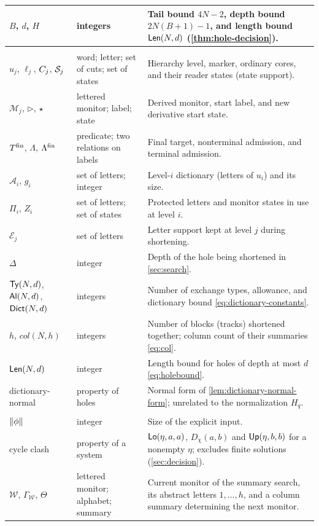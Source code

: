 \begin{longtable}{@{}>{\raggedright\arraybackslash}p{.21\linewidth}>{\raggedright\arraybackslash}p{.28\linewidth}>{\raggedright\arraybackslash}p{.44\linewidth}@{}}
$B$, $d$, $H$ & integers & Tail bound $4N-2$, depth bound $2N(B+1)-1$, and length bound $\mathsf{Len}(N,d)$ (\cref{thm:hole-decision}).\\
\midrule
\multicolumn{3}{@{}l}{\emph{Hierarchies and compression (\cref{sec:depth,sec:search,sec:complexity})}}\\
$u_j$, $\ell_j$, $C_j$, $\mathcal S_j$ & word; letter; set of cuts; set of states & Hierarchy level, marker, ordinary cores, and their reader states (state support).\\
$\mathcal M_j$, $\triangleright$, $\star$ & lettered monitor; label; state & Derived monitor, start label, and new derivative start state.\\
$T^{\mathrm{fin}}$, $\Lambda$, $\Lambda^{\mathrm{fin}}$ & predicate; two relations on labels & Final target, nonterminal admission, and terminal admission.\\
$\mathcal A_i$, $g_i$ & set of letters; integer & Level-$i$ dictionary (letters of $u_i$) and its size.\\
$\Pi_i$, $Z_i$ & set of letters; set of states & Protected letters and monitor states in use at level $i$.\\
$\mathcal E_j$ & set of letters & Letter support kept at level $j$ during shortening.\\
$\Delta$ & integer & Depth of the hole being shortened in \cref{sec:search}.\\
$\mathsf{Ty}(N,d)$, $\mathsf{Al}(N,d)$, $\mathsf{Dict}(N,d)$ & integers & Number of exchange types, allowance, and dictionary bound \eqref{eq:dictionary-constants}.\\
$h$, $\mathit{col}(N,h)$ & integers & Number of blocks (tracks) shortened together; column count of their summaries \eqref{eq:col}.\\
$\mathsf{Len}(N,d)$ & integer & Length bound for holes of depth at most $d$ \eqref{eq:holebound}.\\
dictionary-normal & property of holes & Normal form of \cref{lem:dictionary-normal-form}; unrelated to the normalization $H_q$.\\
\midrule
\multicolumn{3}{@{}l}{\emph{Complexity (\cref{sec:complexity})}}\\
$\|\phi\|$ & integer & Size of the explicit input.\\
cycle clash & property of a system & $\mathsf{Lo}(\eta,a,a)$, $D_\chi(a,b)$ and $\mathsf{Up}(\eta,b,b)$ for a nonempty $\eta$; excludes finite solutions (\cref{sec:decision}).\\
$\mathcal W$, $\Gamma_{\mathcal W}$, $\Theta$ & lettered monitor; alphabet; summary & Current monitor of the summary search, its abstract letters $1,\ldots,h$, and a column summary determining the next monitor.\\

\end{longtable}
